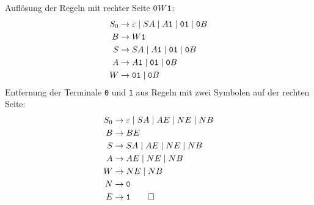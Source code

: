 \begin{loesung}
Auflösung der Regeln mit rechter Seite ${\tt 0}W{\tt 1}$:
\begin{align*}
S_0&\to \varepsilon\mid SA\mid A{\tt 1}\mid {\tt 01}\mid {\tt 0}B\\
B  &\to W{\tt 1}\\
S  &\to SA\mid A{\tt 1}\mid {\tt 01}\mid {\tt 0}B\\
A  &\to A{\tt 1}\mid {\tt 01}\mid {\tt 0}B\\
W  &\to {\tt 01}\mid  {\tt 0}B
\end{align*}
Entfernung der Terminale {\tt 0} und {\tt 1} aus Regeln mit zwei Symbolen
auf der rechten Seite:
\begin{align*}
S_0&\to \varepsilon\mid SA\mid AE\mid NE\mid NB\\
B  &\to BE\\
S  &\to SA\mid AE\mid NE\mid NB\\
A  &\to AE\mid NE\mid NB\\
W  &\to NE\mid  NB\\
N  &\to {\tt 0}\\
E  &\to {\tt 1}
\qedhere
\end{align*}
\end{loesung}
